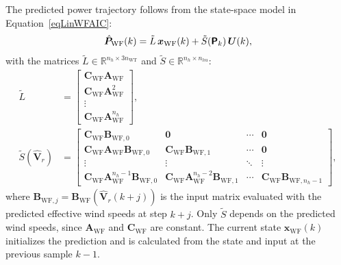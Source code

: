 The predicted power trajectory follows from the state-space model in Equation~\eqref{eqLinWFAIC}:
\begin{align*}
    \hat{\bm{P}}_{\text{WF}}(k) = \tilde{L}\, \bm{x}_{\text{WF}}(k) + \tilde{S}(\bm{\mathsf{P}}_k)\, \bm{U}(k),
\end{align*}
with the matrices $\tilde{L} \in \mathbb{R}^{n_h \times 3n_{\text{WT}}}$ and $\tilde{S} \in \mathbb{R}^{n_h \times n_{hu}}$:
\begin{equation} \label{eq:ltildeWF}
    \begin{aligned}
        \tilde{L} &=
        \begin{bmatrix}
            \bm{C}_{\text{WF}} \bm{A}_{\text{WF}} \\ \bm{C}_{\text{WF}} \bm{A}_{\text{WF}}^2 \\ \vdots \\ \bm{C}_{\text{WF}} \bm{A}_{\text{WF}}^{n_h}
        \end{bmatrix}, \\
        \tilde{S}(\hat{\bm{V}}_r) &=
        \begin{bmatrix}
            \bm{C}_{\text{WF}} \bm{B}_{\text{WF},0} & \bm{0} & \cdots & \bm{0} \\
            \bm{C}_{\text{WF}} \bm{A}_{\text{WF}} \bm{B}_{\text{WF},0} & \bm{C}_{\text{WF}} \bm{B}_{\text{WF},1} & \cdots & \bm{0} \\
            \vdots & \vdots & \ddots & \vdots \\
            \bm{C}_{\text{WF}} \bm{A}_{\text{WF}}^{n_h-1} \bm{B}_{\text{WF},0} & \bm{C}_{\text{WF}} \bm{A}_{\text{WF}}^{n_h-2} \bm{B}_{\text{WF},1} & \cdots & \bm{C}_{\text{WF}} \bm{B}_{\text{WF},n_h-1}
        \end{bmatrix},
    \end{aligned}
\end{equation}
where $\bm{B}_{\text{WF},j} = \bm{B}_{\text{WF}}(\hat{\bm{V}}_r(k+j))$ is the input matrix evaluated with the predicted effective wind speeds at step $k+j$. Only $\tilde{S}$ depends on the predicted wind speeds, since $\bm{A}_{\text{WF}}$ and $\bm{C}_{\text{WF}}$ are constant. The current state $\bm{x}_{\text{WF}}(k)$ initializes the prediction and is calculated from the state and input at the previous sample $k-1$.

